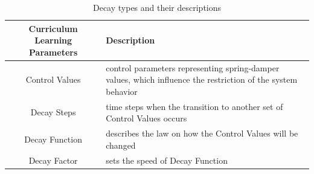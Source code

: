 \begin{table}[ht]
\caption{Decay types and their descriptions}
\begin{tabular}{|c|p{5cm}|}
\hline
\textbf{Curriculum Learning Parameters} & \textbf{Description} \\ \hline
Control Values & control parameters representing spring-damper values, which influence the restriction of the system behavior\\ \hline
Decay Steps & time steps when the transition to another set of Control Values occurs\\ \hline
Decay Function & describes the law on how the Control Values will be changed\\ \hline
Decay Factor & sets the speed of Decay Function\\ \hline
\end{tabular}
\end{table}


